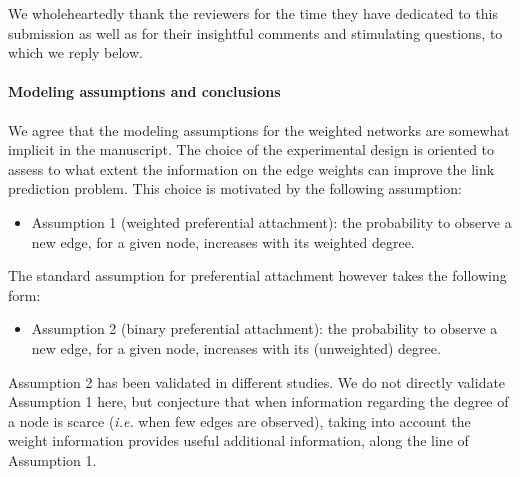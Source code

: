 \documentclass{article}
\begin{document}
We wholeheartedly thank the reviewers for the time they have dedicated to this submission as well as for their insightful comments and stimulating questions, to which we reply below.

\paragraph{Modeling assumptions and conclusions}
We agree that the modeling assumptions for the weighted networks are somewhat implicit in the manuscript. The choice of the experimental design is oriented to assess to what extent the information on the edge weights can improve the link prediction problem. This choice is motivated by the following assumption:
%
\begin{itemize}
\item Assumption 1 (weighted preferential attachment): the probability to observe a new edge, for a given node, increases with its weighted degree. 
\end{itemize}
%
The standard assumption for preferential attachment however takes the following form:
\begin{itemize}
\item Assumption 2 (binary preferential attachment): the probability to observe a new edge, for a given node, increases with its (unweighted) degree.
\end{itemize}
%
Assumption 2 has been validated in different studies. We do not directly validate Assumption 1 here, but conjecture that when information regarding the degree of a node is scarce (\textit{i.e.} when few edges are observed), taking into account the weight information provides useful additional information, along the line of Assumption 1.
\end{document}
